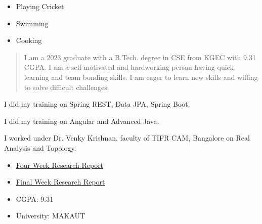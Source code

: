 \documentclass[10pt,legalpaper,ragged2e,withhyper]{altacv}
\newenvironment{sloppypar*}{\sloppy\ignorespaces}{\par}
\begin{document}
\begin{paracol}{2}
    \begin{sloppypar*}
        \begin{itemize}
            \item Playing Cricket
            \item Swimming
            \item Cooking
        \end{itemize}
    \end{sloppypar*}

    \newpage
    \switchcolumn

    \begin{quote}

        I am a 2023 graduate with a B.Tech. degree in CSE from KGEC with 9.31 CGPA. I am a self-motivated and hardworking person having quick learning and team bonding skills. I am eager to learn new skills and willing to solve difficult challenges.

    \end{quote}

    I did my training on Spring REST, Data JPA, Spring Boot.
    \divider

    I did my training on Angular and Advanced Java.
    \divider

    I worked under Dr. Venky Krishnan, faculty of TIFR CAM, Bangalore on Real Analysis and Topology. \\
    \begin{itemize}
        \item \href{https://www.academia.edu/94639467/Four_Week_Research_Report_of_IASC_INSA_NASI_Summer_Research_Fellowship?source=swp_share}{Four Week Research Report}
        \item \href{https://www.academia.edu/94640080/Final_Week_Research_Report_of_IASC_INSA_NASI_Summer_Research_Fellowship?source=swp_share}{Final Week Research Report}
    \end{itemize}

    \begin{minipage}[t]{0.2\textwidth}
        \begin{itemize}
            \item CGPA: 9.31
        \end{itemize}
    \end{minipage}
    \begin{minipage}[t]{0.4\textwidth}
        \begin{itemize}
            \item University: MAKAUT
        \end{itemize}
    \end{minipage}
    \divider


\end{paracol}
\end{document}
